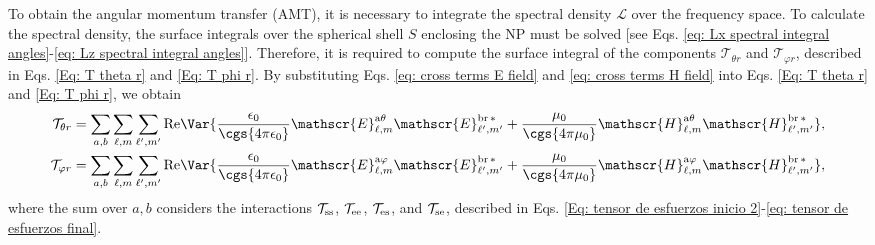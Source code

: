 %
To obtain the angular momentum transfer (AMT), it is necessary to integrate the spectral density $\mathcal{L}$ over the frequency space. To calculate the spectral density, the surface integrals over the spherical shell $S$ enclosing the NP must be solved [see Eqs. \eqref{eq: Lx spectral integral angles}-\eqref{eq: Lz spectral integral angles}]. Therefore, it is required to compute the surface integral of the components $\mathcal{T}_{\theta r}$ and $\mathcal{T}_{\varphi r}$, described in Eqs. \eqref{Eq: T theta r} and \eqref{Eq: T phi r}. By substituting Eqs. \eqref{eq: cross terms E field} and \eqref{eq: cross terms H field} into Eqs. \eqref{Eq: T theta r} and \eqref{Eq: T phi r}, we obtain
%
\begin{align}
\mathcal{T}_{\theta r} &= \sum_{a,b}\sum_{\ell, m} \sum_{\ell^{\prime}, m^{\prime}} {\rm Re}\Var{\frac{\epsilon_0}{\cgs{4\pi\epsilon_0}} \mathscr{E}_{\ell, m}^{\text{a}\theta}\mathscr{E}_{\ell^{\prime}, m^{\prime}}^{\text{br}\,*} + \frac{\mu_0}{\cgs{4\pi\mu_0}} \mathscr{H}_{\ell, m}^{\text{a}\theta}\mathscr{H}_{\ell^{\prime}, m^{\prime}}^{\text{br}\,*}  }, \label{Eq: T theta t sum}\\
\mathcal{T}_{\varphi r} &= \sum_{a,b}\sum_{\ell, m} \sum_{\ell^{\prime}, m^{\prime}} {\rm Re}\Var{\frac{\epsilon_0}{\cgs{4\pi\epsilon_0}} \mathscr{E}_{\ell, m}^{\text{a}\varphi}\mathscr{E}_{\ell^{\prime}, m^{\prime}}^{\text{br}\,*} + \frac{\mu_0}{\cgs{4\pi\mu_0}} \mathscr{H}_{\ell, m}^{\text{a}\varphi}\mathscr{H}_{\ell^{\prime}, m^{\prime}}^{\text{br}\,*}  }, \label{Eq: T phi t sum}
\end{align}
where the sum over $a, b$ considers the interactions $\mathcal{T}_{\rm ss}$, $\mathcal{T}_{\rm ee}$, $\mathcal{T}_{\rm es}$, and $\mathcal{T}_{\rm se}$, described in Eqs. \eqref{Eq: tensor de esfuerzos inicio 2}-\eqref{eq: tensor de esfuerzos final}.

